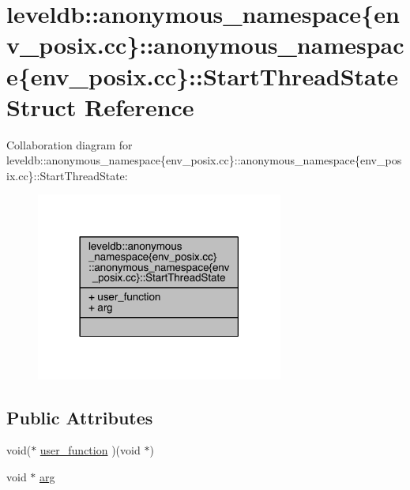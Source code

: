 \hypertarget{structleveldb_1_1anonymous__namespace_02env__posix_8cc_03_1_1anonymous__namespace_02env__posix_8cc_03_1_1_start_thread_state}{}\section{leveldb\+:\+:anonymous\+\_\+namespace\{env\+\_\+posix.\+cc\}\+:\+:anonymous\+\_\+namespace\{env\+\_\+posix.\+cc\}\+:\+:Start\+Thread\+State Struct Reference}
\label{structleveldb_1_1anonymous__namespace_02env__posix_8cc_03_1_1anonymous__namespace_02env__posix_8cc_03_1_1_start_thread_state}


Collaboration diagram for leveldb\+:\+:anonymous\+\_\+namespace\{env\+\_\+posix.\+cc\}\+:\+:anonymous\+\_\+namespace\{env\+\_\+posix.\+cc\}\+:\+:Start\+Thread\+State\+:
\nopagebreak
\begin{figure}[H]
\begin{center}
\leavevmode
\includegraphics[width=230pt]{structleveldb_1_1anonymous__namespace_02env__posix_8cc_03_1_1anonymous__namespace_02env__posix_89741f6fd9af971ae809f01985be735a6}
\end{center}
\end{figure}
\subsection*{Public Attributes}
\begin{DoxyCompactItemize}
\item 
void($\ast$ \hyperlink{structleveldb_1_1anonymous__namespace_02env__posix_8cc_03_1_1anonymous__namespace_02env__posix_8cc_03_1_1_start_thread_state_af7bc1567d580f61c4e1ec02847557e3b}{user\+\_\+function} )(void $\ast$)
\item 
void $\ast$ \hyperlink{structleveldb_1_1anonymous__namespace_02env__posix_8cc_03_1_1anonymous__namespace_02env__posix_8cc_03_1_1_start_thread_state_a1acb702d723e5733df9fd3964c6adafa}{arg}
\end{DoxyCompactItemize}


